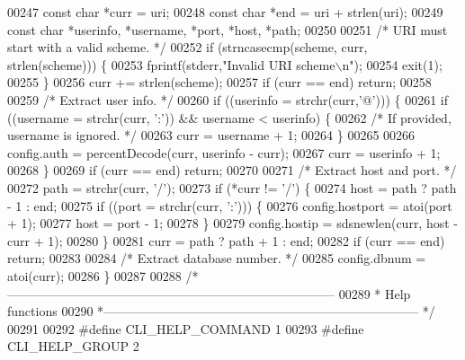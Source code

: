\begin{DoxyCode}
{{{{00247     \textcolor{keyword}{const} \textcolor{keywordtype}{char} *curr = uri;
00248     \textcolor{keyword}{const} \textcolor{keywordtype}{char} *end = uri + strlen(uri);
00249     \textcolor{keyword}{const} \textcolor{keywordtype}{char} *userinfo, *username, *port, *host, *path;
00250 
00251     \textcolor{comment}{/* URI must start with a valid scheme. */}
00252     \textcolor{keywordflow}{if} (strncasecmp(scheme, curr, strlen(scheme))) \{
00253         fprintf(stderr,\textcolor{stringliteral}{"Invalid URI scheme\(\backslash\)n"});
00254         exit(1);
00255     \}
00256     curr += strlen(scheme);
00257     \textcolor{keywordflow}{if} (curr == end) \textcolor{keywordflow}{return};
00258 
00259     \textcolor{comment}{/* Extract user info. */}
00260     \textcolor{keywordflow}{if} ((userinfo = strchr(curr,\textcolor{stringliteral}{'@'}))) \{
00261         \textcolor{keywordflow}{if} ((username = strchr(curr, \textcolor{stringliteral}{':'})) && username < userinfo) \{
00262             \textcolor{comment}{/* If provided, username is ignored. */}
00263             curr = username + 1;
00264         \}
00265 
00266         config.auth = percentDecode(curr, userinfo - curr);
00267         curr = userinfo + 1;
00268     \}
00269     \textcolor{keywordflow}{if} (curr == end) \textcolor{keywordflow}{return};
00270 
00271     \textcolor{comment}{/* Extract host and port. */}
00272     path = strchr(curr, \textcolor{stringliteral}{'/'});
00273     \textcolor{keywordflow}{if} (*curr != \textcolor{stringliteral}{'/'}) \{
00274         host = path ? path - 1 : end;
00275         \textcolor{keywordflow}{if} ((port = strchr(curr, \textcolor{stringliteral}{':'}))) \{
00276             config.hostport = atoi(port + 1);
00277             host = port - 1;
00278         \}
00279         config.hostip = sdsnewlen(curr, host - curr + 1);
00280     \}
00281     curr = path ? path + 1 : end;
00282     \textcolor{keywordflow}{if} (curr == end) \textcolor{keywordflow}{return};
00283 
00284     \textcolor{comment}{/* Extract database number. */}
00285     config.dbnum = atoi(curr);
00286 \}
00287 
00288 \textcolor{comment}{/*------------------------------------------------------------------------------}
00289 \textcolor{comment}{ * Help functions}
00290 \textcolor{comment}{ *--------------------------------------------------------------------------- */}
00291 
00292 \textcolor{preprocessor}{#}\textcolor{preprocessor}{define} \textcolor{preprocessor}{CLI\_HELP\_COMMAND} 1
00293 \textcolor{preprocessor}{#}\textcolor{preprocessor}{define} \textcolor{preprocessor}{CLI\_HELP\_GROUP} 2
}}}}
\end{DoxyCode}
